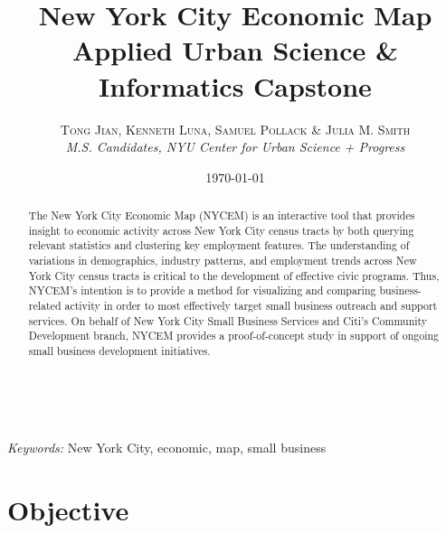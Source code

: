 \documentclass[article, 11pt]{article} %
\title{\textbf{New York City Economic Map}\\ %
Applied Urban Science \& Informatics Capstone} %
\author{\textsc{Tong Jian, Kenneth Luna, Samuel Pollack \& Julia M. Smith} %
\\{\textit{M.S. Candidates, NYU Center for Urban Science + Progress}}} %
\date{\today} %
\makeatletter
\renewcommand{\maketitle}{ %
\begin{flushright} %
{\LARGE\@title} %

\vspace{50pt} %

{\large\@author} %
\\\@date %

\vspace{40pt} %
\end{flushright}
}
\makeatother
\begin{document}
\maketitle %



\begin{abstract}
The New York City Economic Map (NYCEM) is an interactive tool that provides insight to economic activity across New York City census tracts by both querying relevant statistics and clustering key employment features. The understanding of variations in demographics, industry patterns, and employment trends across New York City census tracts is critical to the development of effective civic programs. Thus, NYCEM's intention is to provide a method for visualizing and comparing business-related activity in order to most effectively target small business outreach and support services. On behalf of New York City Small Business Services and Citi's Community Development branch, NYCEM provides a proof-of-concept study in support of ongoing small business development initiatives. 
\end{abstract}

\hspace*{3,6mm}\textit{Keywords:} New York City, economic, map, small business%

\vspace{30pt} %


\section*{Objective}
\end{document}

